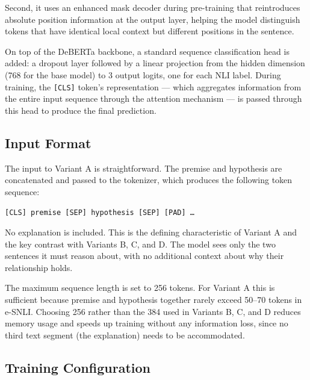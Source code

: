 Second, it uses an enhanced mask decoder during pre-training that
reintroduces absolute position information at the output layer, helping
the model distinguish tokens that have identical local context but
different positions in the sentence.

On top of the DeBERTa backbone, a standard sequence classification head
is added: a dropout layer followed by a linear projection from the
hidden dimension (768 for the base model) to 3 output logits, one for
each NLI label. During training, the \texttt{[CLS]} token's
representation --- which aggregates information from the entire input
sequence through the attention mechanism --- is passed through this
head to produce the final prediction.

\subsection{Input Format}

The input to Variant A is straightforward. The premise and hypothesis
are concatenated and passed to the tokenizer, which produces the
following token sequence:

\begin{center}
\texttt{[CLS] premise [SEP] hypothesis [SEP] [PAD] \ldots}
\end{center}

No explanation is included. This is the defining characteristic of
Variant A and the key contrast with Variants B, C, and D. The model
sees only the two sentences it must reason about, with no additional
context about why their relationship holds.

The maximum sequence length is set to 256 tokens. For Variant A this
is sufficient because premise and hypothesis together rarely exceed
50--70 tokens in e-SNLI. Choosing 256 rather than the 384 used in
Variants B, C, and D reduces memory usage and speeds up training
without any information loss, since no third text segment (the
explanation) needs to be accommodated.

\subsection{Training Configuration}

